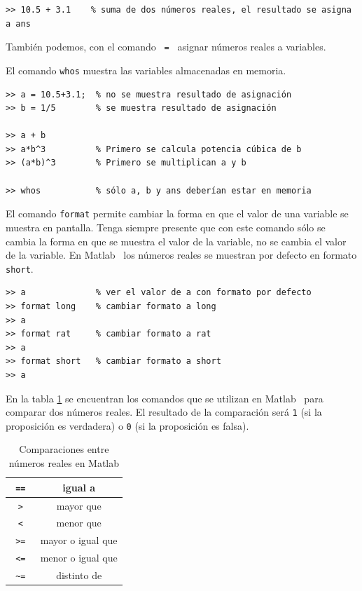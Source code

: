 \documentclass[letter,11pt]{article}
\newcommand\0{\mathbf{0}}
\newcommand{\matlab}{{\sc Matlab }}
\begin{document}
	\medskip
	
	\begin{lstlisting}
>> 10.5 + 3.1    % suma de dos números reales, el resultado se asigna a ans
	\end{lstlisting}
\newpage

	Tambi\'en podemos, con el comando \Verb+ = +
	asignar n\'umeros reales a variables.
		
	El comando \Verb+whos+ muestra las variables almacenadas en memoria.
	
	\medskip
	\begin{lstlisting}
>> a = 10.5+3.1;  % no se muestra resultado de asignación
>> b = 1/5        % se muestra resultado de asignación

>> a + b
>> a*b^3          % Primero se calcula potencia cúbica de b
>> (a*b)^3        % Primero se multiplican a y b

>> whos           % sólo a, b y ans deberían estar en memoria
	\end{lstlisting}
	
	\medskip
				
	El comando \Verb+format+ permite cambiar la forma en que el valor
	de una variable se muestra en pantalla. Tenga siempre presente
	que con este comando s\'olo se cambia la forma en que se muestra el valor de
	la variable, no se cambia el valor de la variable.
	En \matlab\, los n\'umeros reales se muestran por defecto en formato \Verb+short+.
    \medskip

\begin{lstlisting}
>> a              % ver el valor de a con formato por defecto
>> format long    % cambiar formato a long
>> a
>> format rat     % cambiar formato a rat
>> a
>> format short   % cambiar formato a short
>> a
\end{lstlisting}

\medskip
	
	En la tabla \ref{table:compare} se encuentran los comandos que se utilizan en
	\matlab\, para comparar dos n\'umeros reales. El resultado de la comparaci\'on
	ser\'a \Verb+1+ (si la proposici\'on es verdadera) o \Verb+0+ (si la proposici\'on es falsa).	
	
	\begin{table}[ht]
\begin{center}
		\begin{tabular}{|c|c|}\hline
			\Verb+ == + & igual a\\\hline
			\Verb+ > + & mayor que\\\hline
			\Verb+ < + & menor que\\\hline
			\Verb+ >= + & mayor o igual que\\\hline
			\Verb+ <= + & menor o igual que\\\hline
			\Verb+ ~= + & distinto de\\\hline
		\end{tabular}
\end{center} 			
		\caption{Comparaciones entre n\'umeros reales en \matlab}\label{table:compare}
	\end{table}
\end{document}
